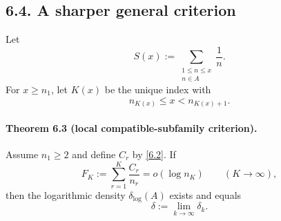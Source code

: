 \subsection*{6.4. A sharper general criterion}
Let
\[
S(x):=\sum_{\substack{1\le n\le x\\ n\in A}}\frac1n.
\]
For $x\ge n_1$, let $K(x)$ be the unique index with
\[
n_{K(x)}\le x<n_{K(x)+1}.
\]

\paragraph{Theorem 6.3 (local compatible-subfamily criterion).}
Assume $n_1\ge 2$ and define $C_r$ by \eqref{6.2}.  If
\begin{equation}
F_K:=\sum_{r=1}^{K}\frac{C_r}{n_r}=o(\log n_K)\qquad(K\to\infty),
\tag{6.6}
\end{equation}
then the logarithmic density $\delta_{\log}(A)$ exists and equals
\begin{equation}
\delta:=\lim_{k\to\infty}\delta_k.
\tag{6.7}
\end{equation}

